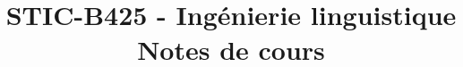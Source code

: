 
\graphicspath{{images/}}

\usepackage{eurosym}
\usepackage{tikz, tikz-qtree}
\usetikzlibrary{positioning}

\title{STIC-B425 - Ingénierie linguistique\\Notes de cours}



\maketitle
\setcounter{tocdepth}{2}
\tableofcontents
\newpage


\newpage

\newpage

\newpage

\newpage

\newpage

\newpage

\newpage



